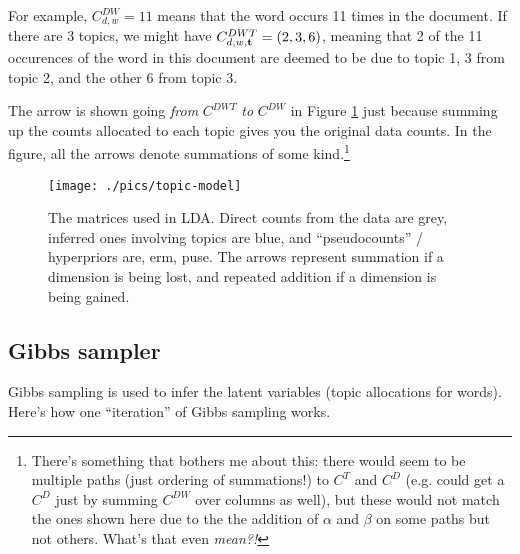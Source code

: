\documentclass[11pt]{article}
\begin{document}
For example, $C^{DW}_{d,w} = 11$ means that the \wth word occurs 11
times in the \dth document. If there are 3 topics, we might have
$C^{DWT}_{d,w,\mathbf{t}} = (2,3,6)$, meaning that 2 of the 11 occurences
of the \wth word in this document are deemed to be due to topic 1, 3
from topic 2, and the other 6 from topic 3.

The arrow is shown going {\it from} $C^{DWT}$ {\it to} $C^{DW}$ in
Figure \ref{fig:3Dmatrices} just because summing up the counts
allocated to each topic gives you the original data counts. In the
figure, all the arrows denote summations of some kind.\footnote{There's something that bothers me about this: there would seem to be
    multiple paths (just ordering of summations!) to $C^T$ and $C^D$
    (e.g. could get a $C^D$ just by summing $C^{DW}$ over columns as
    well), but these would not match the ones shown here due to the
    the addition of $\alpha$ and $\beta$ on some paths but not
    others. What's that even {\it mean?!}}


\begin{figure}
\begin{center}
\texttt{[image: ./pics/topic-model]}
\caption{\label{fig:3Dmatrices} The matrices used in LDA. Direct
  counts from the data are grey, inferred ones involving topics are
  blue, and ``pseudocounts'' / hyperpriors are, erm, puse. The arrows
  represent summation if a dimension is being lost, and repeated
  addition if a dimension is being gained. }
\end{center}
\end{figure}



\subsection{Gibbs sampler}

Gibbs sampling is used to infer the latent variables (topic
allocations for words).  Here's how one ``iteration'' of Gibbs
sampling works.
\end{document}
